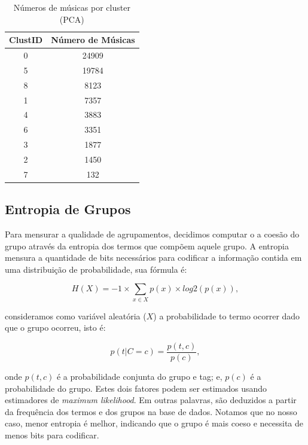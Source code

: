 \documentclass[brazil,a4paper,12pt]{article}
\begin{document}
\begin{table}
\centering
\small
\begin{tabular}{cc}
\toprule
ClustID & Número de Músicas  \\
\midrule
0	&	24909 \\
5	&	19784 \\
8	&	8123 \\
1	&	7357 \\
4	&	3883 \\
6	&	3351 \\
3	&	1877 \\
2	&	1450 \\
7	&	132 \\
\bottomrule
\end{tabular}
\caption{Números de músicas por cluster (PCA)}
\label{tab:cluspca}
\end{table}

\subsection{Entropia de Grupos}

Para mensurar a qualidade de agrupamentos, decidimos computar o a coesão do grupo através da
entropia dos termos que compõem aquele grupo. A entropia mensura a quantidade de bits necessários
para codificar a informação contida em uma distribuição de probabilidade, sua fórmula é:

$$ H(X) = -1 \times \sum_{x \in X} p(x) \times log2(p(x)),$$

\noindent consideramos como variável aleatória ($X$) a probabilidade to termo ocorrer dado
que o grupo ocorreu, isto é:

$$ p(t | C = c) =\frac{p(t, c)}{p(c)}, $$

onde $p(t, c)$ é a probabilidade conjunta do grupo e tag; e, $p(c)$ é a probabilidade do 
grupo. Estes dois fatores podem ser estimados usando estimadores de {\it maximum likelihood}. Em
outras palavras, são deduzidos a partir da frequência dos termos e dos grupos na base de dados. 
Notamos que no nosso caso, menor entropia é melhor, indicando que o grupo é mais coeso e necessita
de menos bits para codificar.
\end{document}
